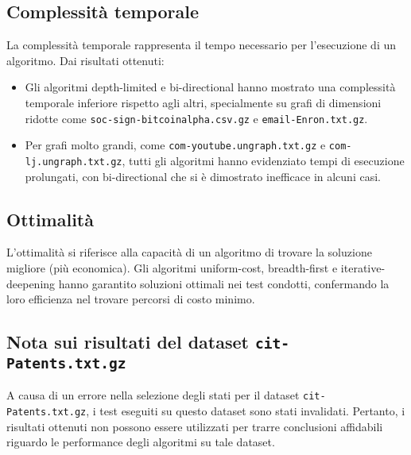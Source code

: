 \documentclass{article}
\begin{document}
\subsection{Complessità temporale}
La complessità temporale rappresenta il tempo necessario per l'esecuzione di un algoritmo. Dai risultati ottenuti:
\begin{itemize}
	\item Gli algoritmi depth-limited e bi-directional hanno mostrato una complessità temporale inferiore rispetto agli altri, specialmente su grafi di dimensioni ridotte come \texttt{soc-sign-bitcoinalpha.csv.gz} e \texttt{email-Enron.txt.gz}.
	\item Per grafi molto grandi, come \texttt{com-youtube.ungraph.txt.gz} e \texttt{com-lj.ungraph.txt.gz}, tutti gli algoritmi hanno evidenziato tempi di esecuzione prolungati, con bi-directional che si è dimostrato inefficace in alcuni casi.
\end{itemize}

\subsection{Ottimalità}
L'ottimalità si riferisce alla capacità di un algoritmo di trovare la soluzione migliore (più economica). Gli algoritmi uniform-cost, breadth-first e iterative-deepening hanno garantito soluzioni ottimali nei test condotti, confermando la loro efficienza nel trovare percorsi di costo minimo.

\subsection{Nota sui risultati del dataset \texttt{cit-Patents.txt.gz}}
A causa di un errore nella selezione degli stati per il dataset \texttt{cit-Patents.txt.gz}, i test eseguiti su questo dataset sono stati invalidati. Pertanto, i risultati ottenuti non possono essere utilizzati per trarre conclusioni affidabili riguardo le performance degli algoritmi su tale dataset.

\newpage
\nocite{kumar2016edge,kumar2018rev2,jleskovec2009community,klimmt2004introducing,yang2012defining,leskovec2005graphs}
\printbibliography
\end{document}
